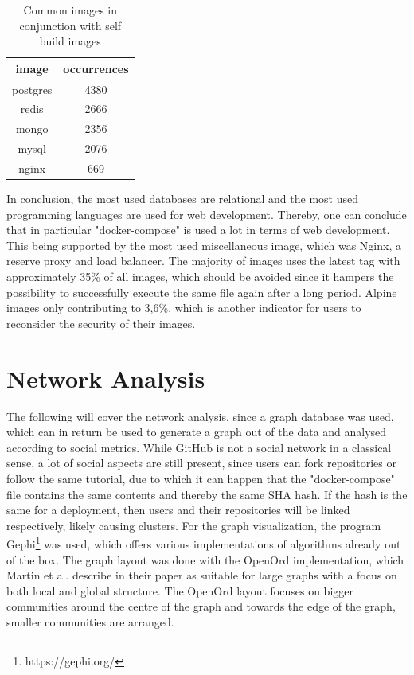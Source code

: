 \begin{table}[h!]
    \centering
    \begin{tabular}{ |c|c| }
    \hline
    image & occurrences \\
    \hline
         postgres & 4380 \\
         redis & 2666 \\
         mongo & 2356 \\
         mysql & 2076 \\
         nginx & 669 \\
    \hline
    \end{tabular}
    \caption{Common images in conjunction with self build images}
    \label{self_build_commons}
\end{table}

In conclusion, the most used databases are relational and the most used programming languages are used for web development. Thereby, one can conclude that in particular "docker-compose" is used a lot in terms of web development. This being supported by the most used miscellaneous image, which was Nginx, a reserve proxy and load balancer. The majority of images uses the latest tag with approximately 35\% of all images, which should be avoided since it hampers the possibility to successfully execute the same file again after a long period. Alpine images only contributing to 3,6\%, which is another indicator for users to reconsider the security of their images.

\section{Network Analysis}

The following will cover the network analysis, since a graph database was used, which can in return be used to generate a graph out of the data and analysed according to social metrics. While GitHub is not a social network in a classical sense, a lot of social aspects are still present, since users can fork repositories or follow the same tutorial, due to which it can happen that the "docker-compose" file contains the same contents and thereby the same SHA hash. If the hash is the same for a deployment, then users and their repositories will be linked respectively, likely causing clusters.
For the graph visualization, the program Gephi\footnote{https://gephi.org/} was used, which offers various implementations of algorithms already out of the box. The graph layout was done with the OpenOrd implementation, which Martin et al. describe in their paper as suitable for large graphs with a focus on both local and global structure\cite{openOrd}. The OpenOrd layout focuses on bigger communities around the centre of the graph and towards the edge of the graph, smaller communities are arranged.

